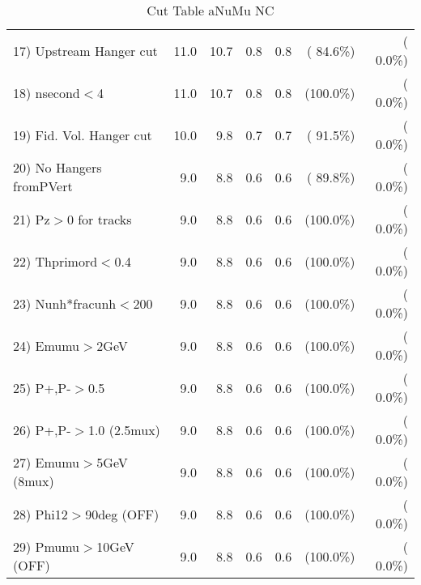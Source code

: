\begin{table}[h!]
\begin{tabular}{||l||r|r|r|r|r|r||}
 17) Upstream Hanger cut  &         11.0 &         10.7 &          0.8 &          0.8 & ( 84.6\%) & (  0.0\%) \\
 18) nsecond$<$4          &         11.0 &         10.7 &          0.8 &          0.8 & (100.0\%) & (  0.0\%) \\
 19) Fid. Vol. Hanger cut &         10.0 &          9.8 &          0.7 &          0.7 & ( 91.5\%) & (  0.0\%) \\
 20) No Hangers fromPVert &          9.0 &          8.8 &          0.6 &          0.6 & ( 89.8\%) & (  0.0\%) \\
 21) Pz$>$0 for tracks    &          9.0 &          8.8 &          0.6 &          0.6 & (100.0\%) & (  0.0\%) \\
 22) Thprimord$<$0.4      &          9.0 &          8.8 &          0.6 &          0.6 & (100.0\%) & (  0.0\%) \\
 23) Nunh*fracunh$<$200   &          9.0 &          8.8 &          0.6 &          0.6 & (100.0\%) & (  0.0\%) \\
 24) Emumu$>$2GeV         &          9.0 &          8.8 &          0.6 &          0.6 & (100.0\%) & (  0.0\%) \\
 25) P+,P-$>$0.5          &          9.0 &          8.8 &          0.6 &          0.6 & (100.0\%) & (  0.0\%) \\
 26) P+,P-$>$1.0 (2.5mux) &          9.0 &          8.8 &          0.6 &          0.6 & (100.0\%) & (  0.0\%) \\
 27) Emumu$>$5GeV  (8mux) &          9.0 &          8.8 &          0.6 &          0.6 & (100.0\%) & (  0.0\%) \\
 28) Phi12$>$90deg  (OFF) &          9.0 &          8.8 &          0.6 &          0.6 & (100.0\%) & (  0.0\%) \\
 29) Pmumu$>$10GeV  (OFF) &          9.0 &          8.8 &          0.6 &          0.6 & (100.0\%) & (  0.0\%) \\
 \hline
 \hline
 \end{tabular}
 \caption{Cut Table  aNuMu NC }
 \label{tab-cutcohjpsi-mumu_anumunc}
 \end{table}
